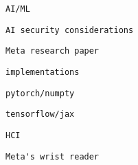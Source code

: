       \protect\hypertarget{ID_1967596060}{}{}

\begin{verbatim}
AI/ML
\end{verbatim}

       
       
        \protect\hypertarget{ID_36142615}{}{}

\begin{verbatim}
AI security considerations
\end{verbatim}
       

       
       
        \protect\hypertarget{ID_116187376}{}{}

\begin{verbatim}
Meta research paper
\end{verbatim}
       

       
       
        \protect\hypertarget{ID_1260603956}{}{}

\begin{verbatim}
implementations
\end{verbatim}

         
         
          \protect\hypertarget{ID_1063376662}{}{}

\begin{verbatim}
pytorch/numpty
\end{verbatim}
         

         
         
          \protect\hypertarget{ID_134252388}{}{}

\begin{verbatim}
tensorflow/jax
\end{verbatim}
         
       

       
       
        \protect\hypertarget{ID_430541012}{}{}

\begin{verbatim}
HCI
\end{verbatim}

         
         
          \protect\hypertarget{ID_1436522225}{}{}

\begin{verbatim}
Meta's wrist reader
\end{verbatim}
         

         
         
